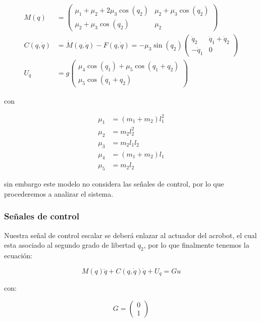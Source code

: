 \documentclass{article}
\begin{document}
\[
\begin{align}
M(q) &=
\begin{pmatrix}
\mu_1 + \mu_2 + 2\mu_3 \cos{(q_2)} & \mu_2 + \mu_3 \cos{(q_2)} \\
\mu_2 + \mu_3 \cos{(q_2)} & \mu_2
\end{pmatrix} \\
C(q, \dot{q}) &= \dot{M}(q, \dot{q}) - F(q, \dot{q}) =
-\mu_3 \sin{(q_2)}
\begin{pmatrix}
\dot{q}_2 & \dot{q}_1 + \dot{q}_2 \\
-\dot{q}_1 & 0
\end{pmatrix} \\
U_q &= g
\begin{pmatrix}
\mu_4 \cos{(q_1)} + \mu_5 \cos{(q_1 + q_2)} \\
\mu_5 \cos{(q_1 + q_2)}
\end{pmatrix}
\end{align}
\]

con

\[
\begin{align}
\mu_1 &= (m_1 + m_2) l_1^2 \\
\mu_2 &= m_2 l_2^2 \\
\mu_3 &= m_2 l_1 l_2 \\
\mu_4 &= \left( m_1 + m_2 \right) l_1 \\
\mu_5 &= m_2 l_2
\end{align}
\]

sin embargo este modelo no considera las señales de control, por lo que
procederemos a analizar el sistema.

    \subsubsection*{Señales de control}\label{seuxf1ales-de-control}

    Nuestra señal de control escalar se deberá enlazar al actuador del
acrobot, el cual esta asociado al segundo grado de libertad \(q_2\), por
lo que finalmente tenemos la ecuación:

\[
M(q) \ddot{q} + C(q, \dot{q}) \dot{q} + U_q = G u
\]

con:

\[
G =
\begin{pmatrix}
0 \\
1
\end{pmatrix}
\]
\end{document}
